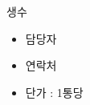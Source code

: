 \documentclass[aspectratio=1610,17pt,xcolor=pdftex,dvipsnames,table,handout]{beamer}
\begin{document}
		\begin{frame} [t,plain]
			\begin{block} {생수 }
			\begin{itemize}
				\item 담당자 
				\item 연락처
				\item  단가 :  1통당 
			\end{itemize}
			\end{block}
		\end{frame}


\end{document}
